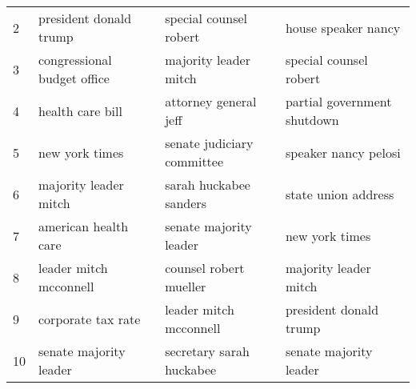 \begin{table}[H]
\begin{tabular}{l||l|l|l}
    2   & president donald trump      & special counsel robert     & house speaker nancy         \\ 
    3   & congressional budget office & majority leader mitch      & special counsel robert      \\
    4   & health care bill            & attorney general jeff      & partial government shutdown \\
    5   & new york times              & senate judiciary committee & speaker nancy pelosi        \\
    6   & majority leader mitch       & sarah huckabee sanders     & state union address         \\
    7   & american health care        & senate majority leader     & new york times              \\
    8   & leader mitch mcconnell      & counsel robert mueller     & majority leader mitch       \\
    9   & corporate tax rate          & leader mitch mcconnell     & president donald trump      \\
    10  & senate majority leader      & secretary sarah huckabee   & senate majority leader      \\ \hline

    \end{tabular}
\end{table}